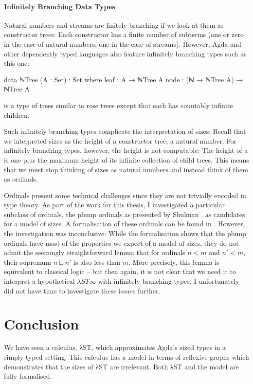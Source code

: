 \paragraph{Infinitely Branching Data Types}

Natural numbers and streams are finitely branching if we look at them as
constructor trees: Each constructor has a finite number of subterms (one or zero
in the case of natural numbers; one in the case of streams). However, Agda and
other dependently typed languages also feature infinitely branching types such
as this one:
\begin{code}
  data ℕTree (A : Set) : Set where
    leaf : A → ℕTree A
    node : (ℕ → ℕTree A) → ℕTree A
\end{code}
 is a type of trees similar to rose trees except that each
 has countably infinite children.

Such infinitely branching types complicate the interpretation of sizes. Recall
that we interpreted sizes as the height of a constructor tree, a natural number.
For infinitely branching types, however, the height is not computable: The
height of a  is one plus the maximum height of its infinite
collection of child trees. This means that we must stop thinking of sizes as
natural numbers and instead think of them as ordinals.

Ordinals present some technical challenges since they are not trivially encoded
in type theory. As part of the work for this thesis, I investigated a particular
subclass of ordinals, the plump ordinals \cite{taylor1996} as presented by
Shulman \cite{shulman2014}, as candidates for a model of sizes. A formalisation
of these ordinals can be found in . However,
the investigation was inconclusive: While the formalisation shows that the plump
ordinals have most of the properties we expect of a model of sizes, they do not
admit the seemingly straightforward lemma that for ordinals $n < m$ and $n′ <
m$, their supremum $n ⊔ n′$ is also less than $m$. More precisely, this lemma is
equivalent to classical logic -- but then again, it is not clear that we need it
to interpret a hypothetical $λST∞$ with infinitely branching types. I
unfortunately did not have time to investigate these issues further.


\section{Conclusion}
\label{sec:conclusion:conclusion}

We have seen a calculus, λST, which approximates Agda's sized types in a
simply-typed setting. This calculus has a model in terms of reflexive graphs
which demonstrates that the sizes of λST are irrelevant. Both λST and the model
are fully formalised.
